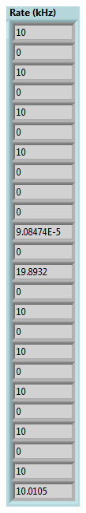 \begin{figure}[H]
	\centering
	\begin{minipage}{0.24\textwidth}
		\centering
		\includegraphics[width=.7\linewidth]{IMG/ch5/latch_tests/fig16}

\end{minipage}
\end{figure}
